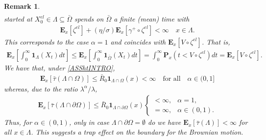 \documentclass[11pt,a4paper]{article}
\newtheorem{remark}{Remark}[section]
\begin{document}
\begin{remark}
\begin{align*}
\end{align*}
started at $X^{el}_0 \in \Lambda \subseteq \bar{\Omega}$ spends on $\bar{\Omega}$ a finite (mean) time with
\begin{align*}
\mathbf{E}_x[\zeta^{el}] + (\eta/\sigma) \mathbf{E}_x[\gamma^+ \circ \zeta^{el}] < \infty \quad x \in \Lambda.
\end{align*}
This corresponds to the case $\alpha=1$ and coincides with $\mathbf{E}_x[V \circ \zeta^{el}]$. That is,
\begin{align*}
\mathbf{E}_x \left[\int_0^\infty \mathbf{1}_\Lambda (X_t) dt \right] \leq \mathbf{E}_x \left[\int_0^\infty \mathbf{1}_{\bar{\Omega}} (X_t) dt \right] = \int_0^\infty \mathbf{P}_x(t< V \circ \zeta^{el}) dt = \mathbf{E}_x[V \circ \zeta^{el}].
\end{align*}
We have that, under \eqref{ASShtINTRO}, 
\begin{align*}
\mathbf{E}_x[\bar{\tau}(\Lambda \cap \Omega)] \leq \bar{R}_0 \mathbf{1}_{\Lambda \cap \Omega}(x) < \infty \quad \textrm{for all} \quad \alpha \in (0,1]
\end{align*}
whereas, due to the ratio $\lambda^\alpha / \lambda$, 
\begin{align}
\mathbf{E}_x[\bar{\tau}(\Lambda \cap \partial \Omega)] \leq \bar{R}_0 \mathbf{1}_{\Lambda \cap \partial \Omega}(x)  \left\lbrace
\begin{array}{ll}
<\infty, & \alpha =1,\\
= \infty, & \alpha \in (0,1).
\end{array} 
\right.
\label{occupMeasXbar}
\end{align}
Thus, for $\alpha \in (0,1)$, only in case $\Lambda \cap \partial \Omega = \emptyset$ do we have $\mathbf{E}_x[\bar{\tau}(\Lambda)] < \infty$ for all $x \in \Lambda$. This suggests a trap effect on the boundary for the Brownian motion.  
\end{remark}
\end{document}
